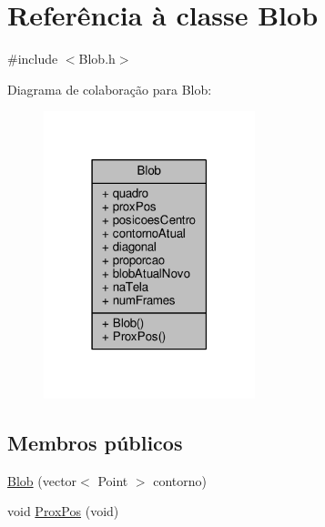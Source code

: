 \hypertarget{class_blob}{}\section{Referência à classe Blob}
\label{class_blob}


{\ttfamily \#include $<$Blob.\+h$>$}



Diagrama de colaboração para Blob\+:
\nopagebreak
\begin{figure}[H]
\begin{center}
\leavevmode
\includegraphics[width=174pt]{class_blob__coll__graph}
\end{center}
\end{figure}
\subsection*{Membros públicos}
\begin{DoxyCompactItemize}
\item 
\hyperlink{class_blob_af61bf71a4f486a4eeba6165bbfdbb8f6}{Blob} (vector$<$ Point $>$ contorno)
\item 
void \hyperlink{class_blob_afbea7ea42d7e01e4d84c799d5fd7e8a5}{Prox\+Pos} (void)
\end{DoxyCompactItemize}
